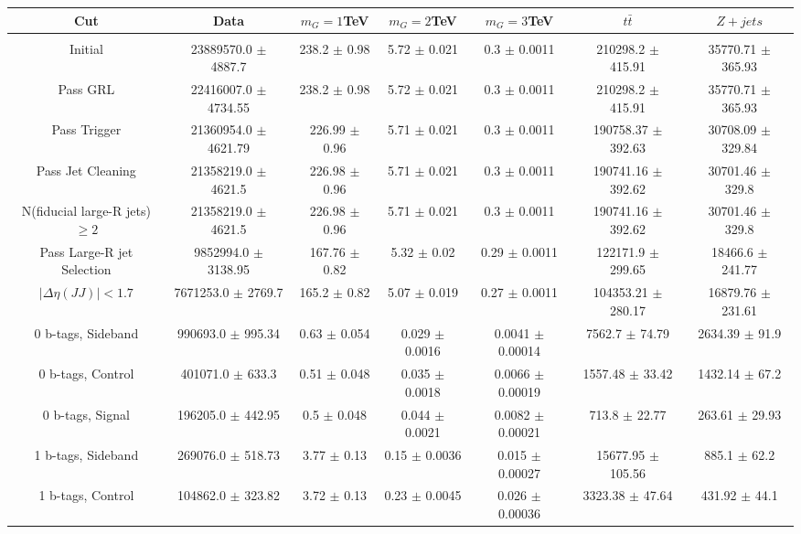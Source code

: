 \begin{footnotesize} 
\begin{tabular}{c|c|c|c|c|c|c} 
Cut & Data & $m_{G}=1$TeV & $m_{G}=2$TeV & $m_{G}=3$TeV & $t\bar{t}$ & $Z+jets$ \\ 
\hline\hline 
& & & & & & \\ 
Initial & 23889570.0 $\pm$ 4887.7 & 238.2 $\pm$ 0.98 & 5.72 $\pm$ 0.021 & 0.3 $\pm$ 0.0011 & 210298.2 $\pm$ 415.91 & 35770.71 $\pm$ 365.93\\ 
Pass GRL & 22416007.0 $\pm$ 4734.55 & 238.2 $\pm$ 0.98 & 5.72 $\pm$ 0.021 & 0.3 $\pm$ 0.0011 & 210298.2 $\pm$ 415.91 & 35770.71 $\pm$ 365.93\\ 
Pass Trigger & 21360954.0 $\pm$ 4621.79 & 226.99 $\pm$ 0.96 & 5.71 $\pm$ 0.021 & 0.3 $\pm$ 0.0011 & 190758.37 $\pm$ 392.63 & 30708.09 $\pm$ 329.84\\ 
Pass Jet Cleaning & 21358219.0 $\pm$ 4621.5 & 226.98 $\pm$ 0.96 & 5.71 $\pm$ 0.021 & 0.3 $\pm$ 0.0011 & 190741.16 $\pm$ 392.62 & 30701.46 $\pm$ 329.8\\ 
N(fiducial large-R jets)$\geq 2$ & 21358219.0 $\pm$ 4621.5 & 226.98 $\pm$ 0.96 & 5.71 $\pm$ 0.021 & 0.3 $\pm$ 0.0011 & 190741.16 $\pm$ 392.62 & 30701.46 $\pm$ 329.8\\ 
Pass Large-R jet Selection & 9852994.0 $\pm$ 3138.95 & 167.76 $\pm$ 0.82 & 5.32 $\pm$ 0.02 & 0.29 $\pm$ 0.0011 & 122171.9 $\pm$ 299.65 & 18466.6 $\pm$ 241.77\\ 
$|\Delta\eta(JJ)|<1.7$ & 7671253.0 $\pm$ 2769.7 & 165.2 $\pm$ 0.82 & 5.07 $\pm$ 0.019 & 0.27 $\pm$ 0.0011 & 104353.21 $\pm$ 280.17 & 16879.76 $\pm$ 231.61\\ 
0 b-tags, Sideband & 990693.0 $\pm$ 995.34 & 0.63 $\pm$ 0.054 & 0.029 $\pm$ 0.0016 & 0.0041 $\pm$ 0.00014 & 7562.7 $\pm$ 74.79 & 2634.39 $\pm$ 91.9\\ 
0 b-tags, Control & 401071.0 $\pm$ 633.3 & 0.51 $\pm$ 0.048 & 0.035 $\pm$ 0.0018 & 0.0066 $\pm$ 0.00019 & 1557.48 $\pm$ 33.42 & 1432.14 $\pm$ 67.2\\ 
0 b-tags, Signal & 196205.0 $\pm$ 442.95 & 0.5 $\pm$ 0.048 & 0.044 $\pm$ 0.0021 & 0.0082 $\pm$ 0.00021 & 713.8 $\pm$ 22.77 & 263.61 $\pm$ 29.93\\ 
1 b-tags, Sideband & 269076.0 $\pm$ 518.73 & 3.77 $\pm$ 0.13 & 0.15 $\pm$ 0.0036 & 0.015 $\pm$ 0.00027 & 15677.95 $\pm$ 105.56 & 885.1 $\pm$ 62.2\\ 
1 b-tags, Control & 104862.0 $\pm$ 323.82 & 3.72 $\pm$ 0.13 & 0.23 $\pm$ 0.0045 & 0.026 $\pm$ 0.00036 & 3323.38 $\pm$ 47.64 & 431.92 $\pm$ 44.1\\ 

\end{tabular}
\end{footnotesize}
